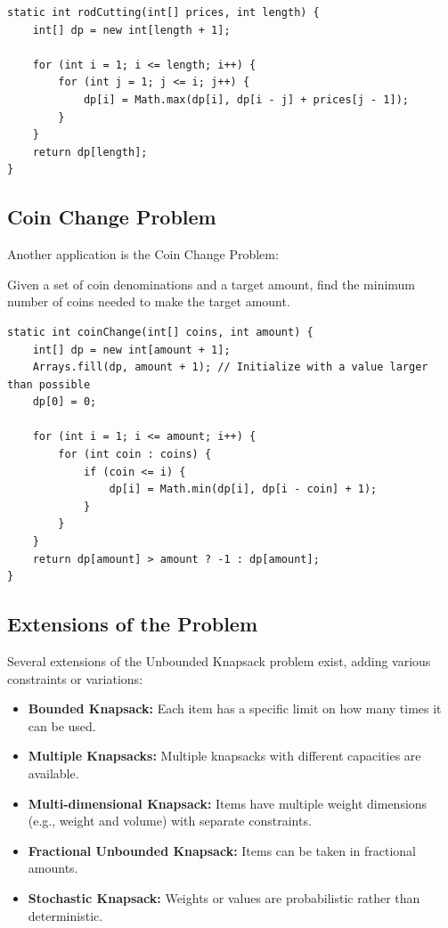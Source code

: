 \documentclass{article}
\begin{document}
\begin{lstlisting}[caption=Rod Cutting Implementation]
static int rodCutting(int[] prices, int length) {
    int[] dp = new int[length + 1];
    
    for (int i = 1; i <= length; i++) {
        for (int j = 1; j <= i; j++) {
            dp[i] = Math.max(dp[i], dp[i - j] + prices[j - 1]);
        }
    }
    return dp[length];
}
\end{lstlisting}

\subsection{Coin Change Problem}

Another application is the Coin Change Problem:

\begin{tcolorbox}[examplebox, title=Coin Change Problem]
Given a set of coin denominations and a target amount, find the minimum number of coins needed to make the target amount.
\end{tcolorbox}

\begin{lstlisting}[caption=Coin Change Implementation]
static int coinChange(int[] coins, int amount) {
    int[] dp = new int[amount + 1];
    Arrays.fill(dp, amount + 1); // Initialize with a value larger than possible
    dp[0] = 0;
    
    for (int i = 1; i <= amount; i++) {
        for (int coin : coins) {
            if (coin <= i) {
                dp[i] = Math.min(dp[i], dp[i - coin] + 1);
            }
        }
    }
    return dp[amount] > amount ? -1 : dp[amount];
}
\end{lstlisting}

\subsection{Extensions of the Problem}

Several extensions of the Unbounded Knapsack problem exist, adding various constraints or variations:

\begin{itemize}[leftmargin=*]
    \item \textbf{Bounded Knapsack:} Each item has a specific limit on how many times it can be used.
    
    \item \textbf{Multiple Knapsacks:} Multiple knapsacks with different capacities are available.
    
    \item \textbf{Multi-dimensional Knapsack:} Items have multiple weight dimensions (e.g., weight and volume) with separate constraints.
    
    \item \textbf{Fractional Unbounded Knapsack:} Items can be taken in fractional amounts.
    
    \item \textbf{Stochastic Knapsack:} Weights or values are probabilistic rather than deterministic.
\end{itemize}
\end{document}

